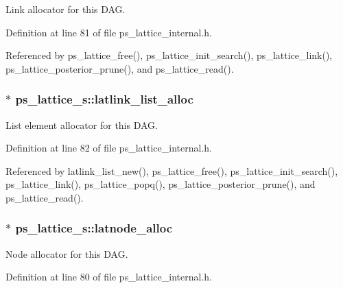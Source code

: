 \-Link allocator for this \-D\-A\-G. 



\-Definition at line 81 of file ps\-\_\-lattice\-\_\-internal.\-h.



\-Referenced by ps\-\_\-lattice\-\_\-free(), ps\-\_\-lattice\-\_\-init\-\_\-search(), ps\-\_\-lattice\-\_\-link(), ps\-\_\-lattice\-\_\-posterior\-\_\-prune(), and ps\-\_\-lattice\-\_\-read().

\subsubsection[{latlink\-\_\-list\-\_\-alloc}]{$\ast$ {\bf ps\-\_\-lattice\-\_\-s\-::latlink\-\_\-list\-\_\-alloc}}\label{structps__lattice__s_a8e9cfaf92f9a3588d018578854c61e88}


\-List element allocator for this \-D\-A\-G. 



\-Definition at line 82 of file ps\-\_\-lattice\-\_\-internal.\-h.



\-Referenced by latlink\-\_\-list\-\_\-new(), ps\-\_\-lattice\-\_\-free(), ps\-\_\-lattice\-\_\-init\-\_\-search(), ps\-\_\-lattice\-\_\-link(), ps\-\_\-lattice\-\_\-popq(), ps\-\_\-lattice\-\_\-posterior\-\_\-prune(), and ps\-\_\-lattice\-\_\-read().

\subsubsection[{latnode\-\_\-alloc}]{$\ast$ {\bf ps\-\_\-lattice\-\_\-s\-::latnode\-\_\-alloc}}\label{structps__lattice__s_a14e4e87550647d5119cd1cc48ff4f3f1}


\-Node allocator for this \-D\-A\-G. 



\-Definition at line 80 of file ps\-\_\-lattice\-\_\-internal.\-h.



